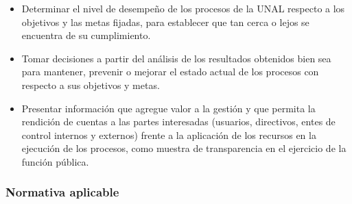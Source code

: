 \documentclass[
]{book}
\begin{document}
\begin{itemize}
\item
  Determinar el nivel de desempeño de los procesos de la UNAL respecto a los objetivos y las metas fijadas, para establecer que tan cerca o lejos se encuentra de su cumplimiento.
\item
  Tomar decisiones a partir del análisis de los resultados obtenidos bien sea para mantener, prevenir o mejorar el estado actual de los procesos con respecto a sus objetivos y metas.
\item
  Presentar información que agregue valor a la gestión y que permita la rendición de cuentas a las partes interesadas (usuarios, directivos, entes de control internos y externos) frente a la aplicación de los recursos en la ejecución de los procesos, como muestra de transparencia en el ejercicio de la función pública.
\end{itemize}

\hypertarget{normativa-aplicable}{%
\subsubsection{Normativa aplicable}\label{normativa-aplicable}}
\end{document}
